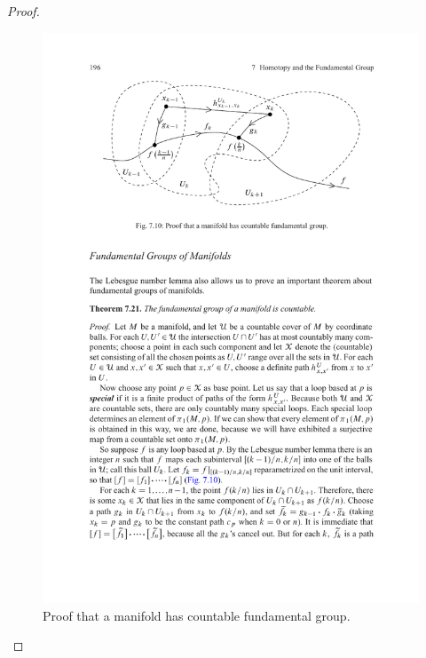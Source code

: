 \begin{proof}
\begin{figure}[htbp]
\centering
\includegraphics{pictures/fandamental-group-of-manifold}
\caption{Proof that a manifold has countable fundamental group.}
\end{figure}
\end{proof}

